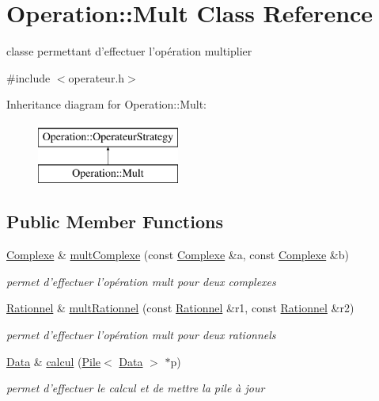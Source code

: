 \hypertarget{classOperation_1_1Mult}{
\section{Operation::Mult Class Reference}
\label{classOperation_1_1Mult}
}


classe permettant d'effectuer l'opération multiplier  




{\ttfamily \#include $<$operateur.h$>$}

Inheritance diagram for Operation::Mult:\begin{figure}[H]
\begin{center}
\leavevmode
\includegraphics[height=2cm]{classOperation_1_1Mult}
\end{center}
\end{figure}
\subsection*{Public Member Functions}
\begin{DoxyCompactItemize}
\item 
\hyperlink{classNombre_1_1Complexe}{Complexe} \& \hyperlink{classOperation_1_1Mult_a34c0e501dacbca2626a7e77783724a4e}{multComplexe} (const \hyperlink{classNombre_1_1Complexe}{Complexe} \&a, const \hyperlink{classNombre_1_1Complexe}{Complexe} \&b)
\begin{DoxyCompactList}\small\item\em permet d'effectuer l'opération mult pour deux complexes \item\end{DoxyCompactList}\item 
\hyperlink{classNombre_1_1Rationnel}{Rationnel} \& \hyperlink{classOperation_1_1Mult_a4de53aba889ab8db3936d3194dea53f1}{multRationnel} (const \hyperlink{classNombre_1_1Rationnel}{Rationnel} \&r1, const \hyperlink{classNombre_1_1Rationnel}{Rationnel} \&r2)
\begin{DoxyCompactList}\small\item\em permet d'effectuer l'opération mult pour deux rationnels \item\end{DoxyCompactList}\item 
\hyperlink{classNombre_1_1Data}{Data} \& \hyperlink{classOperation_1_1Mult_ada56752ff3b1bda104ed35726b3cc153}{calcul} (\hyperlink{classPile}{Pile}$<$ \hyperlink{classNombre_1_1Data}{Data} $>$ $\ast$p)
\begin{DoxyCompactList}\small\item\em permet d'effectuer le calcul et de mettre la pile à jour \item\end{DoxyCompactList}\end{DoxyCompactItemize}


